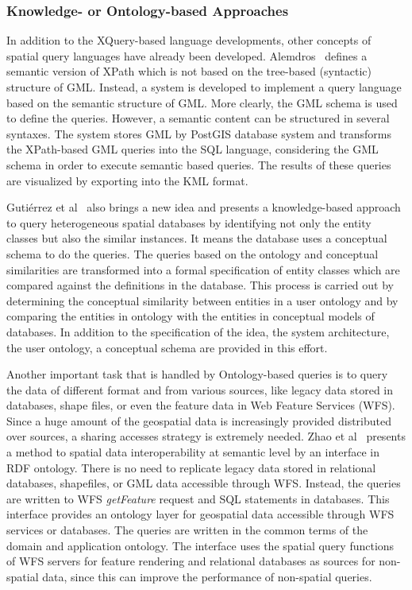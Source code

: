 \documentclass[a4paper,12pt]{article}
\begin{document}
\subsubsection{Knowledge- or Ontology-based Approaches}
\label{ontology}
In addition to the XQuery-based language developments, 
other concepts of spatial query languages have already been developed. 
Alemdros~\cite{Alemdros2011, Alemdros2013} defines a semantic version of XPath 
which is not based on the tree-based (syntactic) structure of GML. Instead, a system is developed to implement a query language based on the semantic structure of GML. More clearly, the GML schema is used to define the queries. However, a semantic content can be structured in several syntaxes. The system stores GML by PostGIS database system and transforms the XPath-based GML queries into the SQL language, considering the GML schema in order to execute semantic based queries. The results of these queries are visualized by exporting into the KML format.

{Gutiérrez et al}~\cite{Gutierrez2004} also brings a new idea and presents a knowledge-based approach 
to query heterogeneous spatial databases by identifying not only the entity classes but also the similar instances. 
It means the database uses a conceptual schema to do the queries. 
The queries based on the ontology and conceptual similarities 
are transformed into a formal specification of entity classes 
which are compared against the definitions in the database. 
This process is carried out by determining the conceptual similarity between entities in a user ontology 
and by comparing the entities in ontology with the entities in conceptual models of databases. 
In addition to the specification of the idea, the system architecture, the user ontology, 
a conceptual schema are provided in this effort.

Another important task that is handled by Ontology-based queries is to query 
the data of different format and from various sources,
like legacy data stored in databases, shape files, 
or even the feature data in Web Feature Services (WFS).
Since a huge amount of the geospatial data is increasingly provided
distributed over sources,
a sharing accesses strategy is extremely needed.
Zhao et al~\cite{Zhao2008} presents a method to spatial data 
interoperability at semantic level by an interface in RDF ontology. 
There is no need to replicate legacy data stored in relational databases, shapefiles, or GML data accessible through WFS. Instead, the queries are written to WFS \textit{getFeature} request and SQL statements in databases. 
This interface provides an ontology layer for geospatial data accessible through WFS services or databases. 
The queries are written in the common terms of the domain and application ontology. 
The interface uses the spatial query functions of WFS servers for feature rendering and relational databases as sources for non-spatial data, since this can improve the performance of non-spatial queries. 
\end{document}
